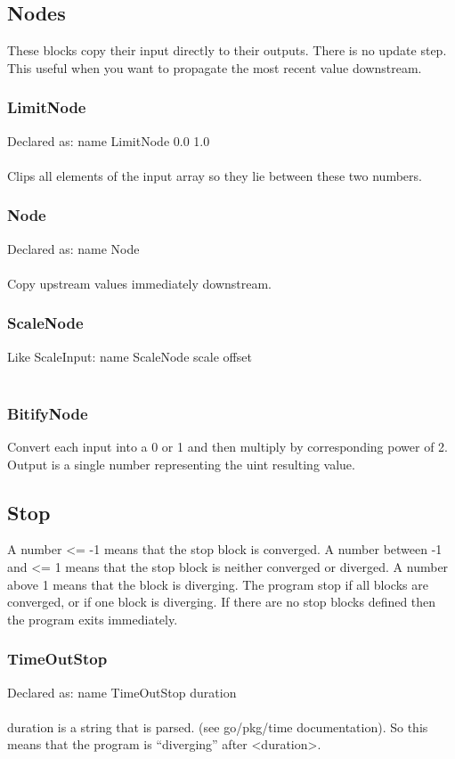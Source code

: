 \documentclass[a4paper]{article}
\begin{document}
\subsection{Nodes}
These blocks copy their input directly to their outputs. There is no update step. This useful when you want to propagate the most recent value downstream.
\subsubsection{LimitNode}
Declared as: name LimitNode 0.0 1.0\\\\
Clips all elements of the input array so they lie between these two numbers.
\subsubsection{Node}
Declared as: name Node\\\\
Copy upstream values immediately downstream.
\subsubsection{ScaleNode}
Like ScaleInput: name ScaleNode scale offset\\\\
\subsubsection{BitifyNode}
Convert each input into a 0 or 1 and then multiply by corresponding power of 2. Output is a single number representing the uint resulting value.
\subsection{Stop}
A number <= -1 means that the stop block is converged. A number between -1 and <= 1 means that the stop block is neither converged or diverged. A number above 1 means that the block is diverging. The program stop if all blocks are converged, or if one block is diverging. If there are no stop blocks defined then the program exits immediately.
\subsubsection{TimeOutStop}
Declared as: name TimeOutStop duration\\\\
duration is a string that is parsed. (see go/pkg/time documentation). So this means that the program is ``diverging'' after <duration>.
\end{document}
